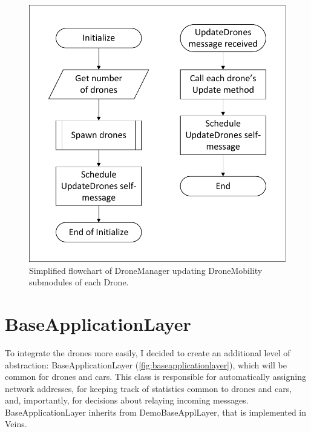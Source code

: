 \documentclass[]{nsm-thesis}
\begin{document}
\begin{figure}
	\centering
	\includegraphics[width=1\textwidth]{figures/DroneManager.pdf}
	\caption{Simplified flowchart of DroneManager updating DroneMobility submodules of each Drone.}
	\label{fig:dronemanagerflow}
\end{figure}



\section{BaseApplicationLayer}

To integrate the drones more easily, I decided to create an additional level of abstraction: BaseApplicationLayer (\cref{fig:baseapplicationlayer}), which will be common for drones and cars. This class is responsible for automatically assigning network addresses, for keeping track of statistics common to drones and cars, and, importantly, for decisions about relaying incoming messages. BaseApplicationLayer inherits from DemoBaseApplLayer, that is implemented in Veins.
\end{document}
